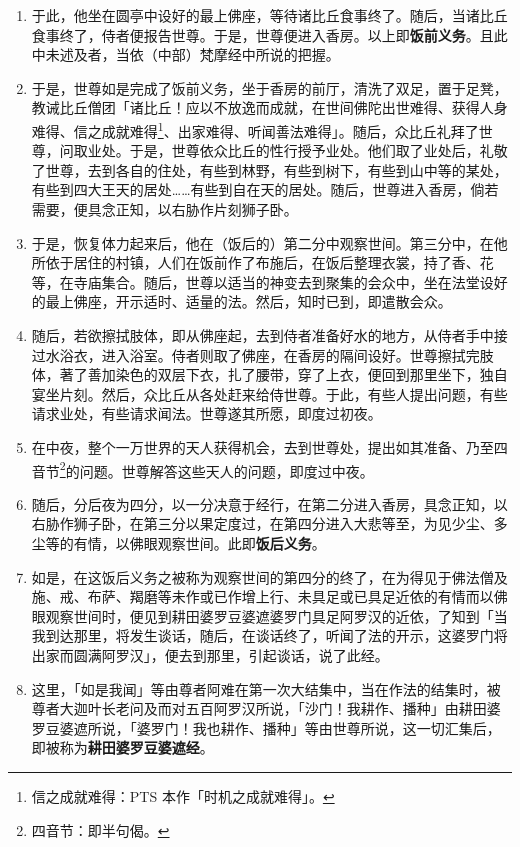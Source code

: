 \begin{enumerate}
\item 于此，他坐在圆亭中设好的最上佛座，等待诸比丘食事终了。随后，当诸比丘食事终了，侍者便报告世尊。于是，世尊便进入香房。以上即\textbf{饭前义务}。且此中未述及者，当依（中部）梵摩经中所说的把握。
\item 于是，世尊如是完成了饭前义务，坐于香房的前厅，清洗了双足，置于足凳，教诫比丘僧团「诸比丘！应以不放逸而成就，在世间佛陀出世难得、获得人身难得、信之成就难得\footnote{信之成就难得：PTS 本作「时机之成就难得」。}、出家难得、听闻善法难得」。随后，众比丘礼拜了世尊，问取业处。于是，世尊依众比丘的性行授予业处。他们取了业处后，礼敬了世尊，去到各自的住处，有些到林野，有些到树下，有些到山中等的某处，有些到四大王天的居处……有些到自在天的居处。随后，世尊进入香房，倘若需要，便具念正知，以右胁作片刻狮子卧。
\item 于是，恢复体力起来后，他在（饭后的）第二分中观察世间。第三分中，在他所依于居住的村镇，人们在饭前作了布施后，在饭后整理衣裳，持了香、花等，在寺庙集合。随后，世尊以适当的神变去到聚集的会众中，坐在法堂设好的最上佛座，开示适时、适量的法。然后，知时已到，即遣散会众。
\item 随后，若欲擦拭肢体，即从佛座起，去到侍者准备好水的地方，从侍者手中接过水浴衣，进入浴室。侍者则取了佛座，在香房的隔间设好。世尊擦拭完肢体，著了善加染色的双层下衣，扎了腰带，穿了上衣，便回到那里坐下，独自宴坐片刻。然后，众比丘从各处赶来给侍世尊。于此，有些人提出问题，有些请求业处，有些请求闻法。世尊遂其所愿，即度过初夜。
\item 在中夜，整个一万世界的天人获得机会，去到世尊处，提出如其准备、乃至四音节\footnote{四音节：即半句偈。}的问题。世尊解答这些天人的问题，即度过中夜。
\item 随后，分后夜为四分，以一分决意于经行，在第二分进入香房，具念正知，以右胁作狮子卧，在第三分以果定度过，在第四分进入大悲等至，为见少尘、多尘等的有情，以佛眼观察世间。此即\textbf{饭后义务}。
\item 如是，在这饭后义务之被称为观察世间的第四分的终了，在为得见于佛法僧及施、戒、布萨、羯磨等未作或已作增上行、未具足或已具足近依的有情而以佛眼观察世间时，便见到耕田婆罗豆婆遮婆罗门具足阿罗汉的近依，了知到「当我到达那里，将发生谈话，随后，在谈话终了，听闻了法的开示，这婆罗门将出家而圆满阿罗汉」，便去到那里，引起谈话，说了此经。
\item 这里，「如是我闻」等由尊者阿难在第一次大结集中，当在作法的结集时，被尊者大迦叶长老问及而对五百阿罗汉所说，「沙门！我耕作、播种」由耕田婆罗豆婆遮所说，「婆罗门！我也耕作、播种」等由世尊所说，这一切汇集后，即被称为\textbf{耕田婆罗豆婆遮经}。

\end{enumerate}
